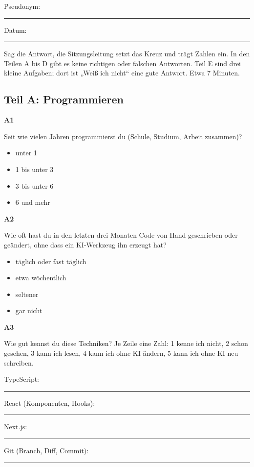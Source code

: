 \noindent Pseudonym:~\rule{2.5em}{0.4pt}\par
\noindent Datum:~\rule{2.5em}{0.4pt}\par
Sag die Antwort, die Sitzungsleitung setzt das Kreuz und trägt Zahlen ein. In den Teilen A bis D gibt es keine richtigen oder falschen Antworten. Teil E sind drei kleine Aufgaben; dort ist „Weiß ich nicht“ eine gute Antwort. Etwa 7 Minuten.

\subsection*{Teil A: Programmieren}

\noindent\begin{minipage}{\linewidth}
\textbf{A1}\par
Seit wie vielen Jahren programmierst du (Schule, Studium, Arbeit zusammen)?

\begin{itemize}[nosep,leftmargin=2.4em]
\item[\kreuz] unter 1
\item[\kreuz] 1 bis unter 3
\item[\kreuz] 3 bis unter 6
\item[\kreuz] 6 und mehr
\end{itemize}
\end{minipage}

\medskip

\noindent\begin{minipage}{\linewidth}
\textbf{A2}\par
Wie oft hast du in den letzten drei Monaten Code von Hand geschrieben oder geändert, ohne dass ein KI-Werkzeug ihn erzeugt hat?

\begin{itemize}[nosep,leftmargin=2.4em]
\item[\kreuz] täglich oder fast täglich
\item[\kreuz] etwa wöchentlich
\item[\kreuz] seltener
\item[\kreuz] gar nicht
\end{itemize}
\end{minipage}

\medskip

\noindent\begin{minipage}{\linewidth}
\textbf{A3}\par
Wie gut kennst du diese Techniken? Je Zeile eine Zahl: 1 kenne ich nicht, 2 schon gesehen, 3 kann ich lesen, 4 kann ich ohne KI ändern, 5 kann ich ohne KI neu schreiben.

\noindent TypeScript:~\rule{2.5em}{0.4pt}\par
\noindent React (Komponenten, Hooks):~\rule{2.5em}{0.4pt}\par
\noindent Next.js:~\rule{2.5em}{0.4pt}\par
\noindent Git (Branch, Diff, Commit):~\rule{2.5em}{0.4pt}\par
\end{minipage}


